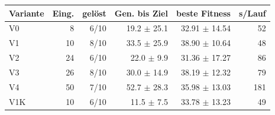 \begin{tabular}{@{}lrrrrr@{}}
  \toprule
  Variante & Eing. & gelöst & Gen. bis Ziel & beste Fitness & s/Lauf \\
  \midrule
  V0 & 8 & 6/10 & 19.2 $\pm$ 25.1 & 32.91 $\pm$ 14.54 & 52 \\
  V1 & 10 & 8/10 & 33.5 $\pm$ 25.9 & 38.90 $\pm$ 10.64 & 48 \\
  V2 & 24 & 6/10 & 22.0 $\pm$ 9.9 & 31.36 $\pm$ 17.27 & 86 \\
  V3 & 26 & 8/10 & 30.0 $\pm$ 14.9 & 38.19 $\pm$ 12.32 & 79 \\
  V4 & 50 & 7/10 & 52.7 $\pm$ 28.3 & 35.98 $\pm$ 13.03 & 181 \\
  V1K & 10 & 6/10 & 11.5 $\pm$ 7.5 & 33.78 $\pm$ 13.23 & 49 \\
  \bottomrule
\end{tabular}
